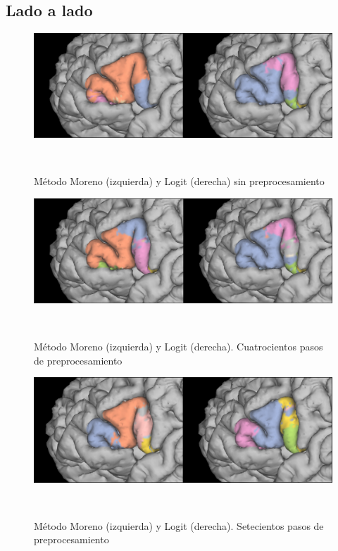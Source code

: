 \subsection{Lado a lado}

\begin{figure}[h!]
                                                                                                                        
\begin{minipage}[b]{\textwidth}
    \includegraphics[width=\textwidth]{img/broca/vs_0.png}
    \caption{M\'etodo Moreno (izquierda) y Logit (derecha) sin preprocesamiento}
\end{minipage} ~

\end{figure}

\begin{figure}[h!]                  
                                                                                                                        
\begin{minipage}[b]{\textwidth}
    \includegraphics[width=\textwidth]{img/broca/vs_400.png}
    \caption{M\'etodo Moreno (izquierda) y Logit (derecha). Cuatrocientos pasos de preprocesamiento}
\end{minipage} ~

\end{figure}

\begin{figure}[h!]

\begin{minipage}[b]{\textwidth}
    \includegraphics[width=\textwidth]{img/broca/vs_700.png}
    \caption{M\'etodo Moreno (izquierda) y Logit (derecha). Setecientos pasos de preprocesamiento}

\end{minipage} ~

\end{figure}
 
